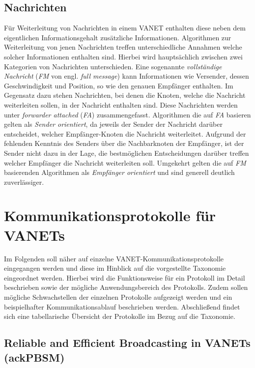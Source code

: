 \documentclass[english,runningheads,a4paper]{llncs}[2018/03/10]
\begin{document}
\subsection{Nachrichten}
Für Weiterleitung von Nachrichten in einem VANET enthalten diese neben dem eigentlichen Informationsgehalt zusätzliche Informationen.
Algorithmen zur Weiterleitung von jenen Nachrichten treffen unterschiedliche Annahmen welche solcher Informationen enthalten sind.
Hierbei wird hauptsächlich zwischen zwei Kategorien von Nachrichten unterschieden.
Eine sogenannte \textit{vollständige Nachricht} (\textit{FM} von engl. \textit{full message}) kann Informationen wie Versender, dessen Geschwindigkeit und Position, so wie den genauen Empfänger enthalten.
Im Gegensatz dazu stehen Nachrichten, bei denen die Knoten, welche die Nachricht weiterleiten sollen, in der Nachricht enthalten sind.
Diese Nachrichten werden unter \textit{forwarder attached} (\textit{FA}) zusammengefasst.
Algorithmen die auf \textit{FA} basieren gelten als \textit{Sender orientiert}, da jeweils der Sender der Nachricht darüber entscheidet, welcher Empfänger-Knoten die Nachricht weiterleitet.
Aufgrund der fehlenden Kenntnis des Senders über die Nachbarknoten der Empfänger, ist der Sender nicht dazu in der Lage, die bestmöglichen Entscheidungen darüber treffen welcher Empfänger die Nachricht weiterleiten soll.
Umgekehrt gelten die auf \textit{FM} basierenden Algorithmen als \textit{Empfänger orientiert} und sind generell deutlich zuverlässiger.



\section{Kommunikationsprotokolle für VANETs}
\label{sec:protocols}
Im Folgenden soll näher auf einzelne VANET-Kommunikationsprotokolle eingegangen werden und diese im Hinblick auf die vorgestellte Taxonomie eingeordnet werden.
Hierbei wird die Funktionsweise für ein Protokoll im Detail beschrieben sowie der mögliche Anwendungsbereich des Protokolls.
Zudem sollen mögliche Schwachstellen der einzelnen Protokolle aufgezeigt werden und ein beispielhafter Kommunikationsablauf beschrieben werden.
Abschließend findet sich eine tabellarische Übersicht der Protokolle im Bezug auf die Taxonomie.

\subsection{Reliable and Efficient Broadcasting in VANETs (ackPBSM)}
\end{document}
